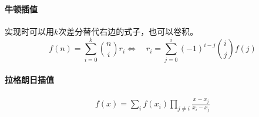 \paragraph{牛顿插值} 
实现时可以用$k$次差分替代右边的式子，也可以卷积。
$$ f(n)=\sum_{i=0}^{k}\binom{n}{i}r_i \iff \quad r_i=\sum_{j=0}^i(-1)^{i-j}\binom{i}{j}f(j)$$
\paragraph{拉格朗日插值}
$$\begin{aligned}f(x) = \sum_i f(x_i)\prod_{j\ne i}\frac{x-x_j}{x_i-x_j}\end{aligned}$$
